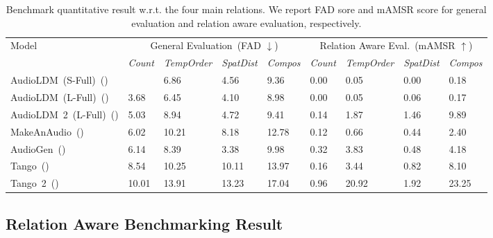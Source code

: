 \begin{table}[t]
\centering
\small
\caption{Benchmark quantitative result w.r.t. the four main relations. We report FAD sore and mAMSR score for general evaluation and relation aware evaluation, respectively.}
\begin{tabular}{l|p{0.5cm}<{\centering}p{1.1cm}<{\centering}p{.8cm}<{\centering}p{.8cm}<{\centering}|p{0.5cm}<{\centering}p{1.1cm}<{\centering}p{0.8cm}<{\centering}p{.8cm}<{\centering}}
\hline
\multirow{2}{*}{Model} & \multicolumn{4}{c|}{General Evaluation~(FAD $\downarrow$)}  & \multicolumn{4}{c}{Relation Aware Eval.~(mAMSR $\uparrow$)} \\
\cline{2-9}
 &  \emph{Count} &  \emph{TempOrder} & \emph{SpatDist} & \emph{Compos} &  \emph{Count} & \emph{TempOrder} & \emph{SpatDist} & \emph{Compos}  \\
\hline
AudioLDM~(S-Full)~(\citeyear{liu2023audioldm})   & \cellcolor{secondcolor}{3.85} & \cellcolor{secondcolor}6.86 &  \cellcolor{thirdcolor}4.56 & \cellcolor{secondcolor}9.36 & 0.00 & 0.05 & 0.00 & 0.18 \\
AudioLDM~(L-Full)~(\citeyear{liu2023audioldm})  & \cellcolor{topcolor}3.68  & \cellcolor{topcolor}6.45  & \cellcolor{secondcolor}4.10 & \cellcolor{topcolor}8.98 & 0.00 & 0.05 & 0.06 & 0.17\\
AudioLDM~2~(L-Full)~(\citeyear{makeanaudio}) & \cellcolor{thirdcolor}5.03 & 8.94 &  4.72 & \cellcolor{thirdcolor}9.41 & 0.14 & 1.87 & \cellcolor{secondcolor}1.46 & \cellcolor{secondcolor}9.89\\
MakeAnAudio~(\citeyear{makeanaudio}) & 6.02 & 10.21 &  8.18 & 12.78 & 0.12 & 0.66 & 0.44 & 2.40 \\
AudioGen~(\citeyear{kreuk2022audiogen})& 6.14 & \cellcolor{thirdcolor}8.39 & \cellcolor{topcolor}3.38 & 9.98 & \cellcolor{secondcolor}0.32 & \cellcolor{secondcolor}3.83 &  0.48 & 4.18\\
Tango~(\citeyear{ghosal2023tango}) & 8.54 &  10.25 & 10.11 & 13.97 & \cellcolor{thirdcolor}0.16 & \cellcolor{thirdcolor}3.44 & \cellcolor{thirdcolor}0.82 & \cellcolor{thirdcolor}8.10 \\
Tango~2~(\citeyear{ghosal2023tango2}) & 10.01  & 13.91 & 13.23 & 17.04 & \cellcolor{topcolor}0.96 & \cellcolor{topcolor}20.92 & \cellcolor{topcolor}1.92& \cellcolor{topcolor}23.25\\
\hline
\end{tabular}
\label{tab:results-fourcates}
\end{table}

\subsection{Relation Aware Benchmarking Result}

